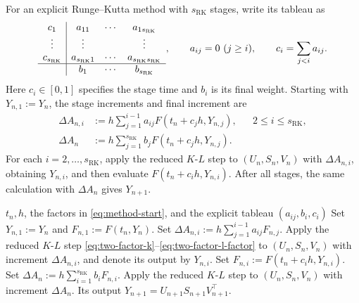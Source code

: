 \documentclass[]{article}
\numberwithin{equation}{section}
\theoremstyle{plain}
\theoremstyle{remark}
\numberwithin{algorithm}{section}
\begin{document}
For an explicit Runge--Kutta method with \(s_{\mathrm{RK}}\) stages,
write its tableau as
\[
 \begin{array}{c|ccc}
  c_1&a_{11}&\cdots&a_{1s_{\mathrm{RK}}}\\
  \vdots&\vdots&&\vdots\\
  c_{s_{\mathrm{RK}}}&a_{s_{\mathrm{RK}}1}&\cdots&a_{s_{\mathrm{RK}}s_{\mathrm{RK}}}\\ \hline
   &b_1&\cdots&b_{s_{\mathrm{RK}}}
 \end{array},
 \qquad a_{ij}=0\ (j\ge i),\qquad
 c_i=\sum_{j<i}a_{ij}.
\]
Here \(c_i\in[0,1]\) specifies the stage time and \(b_i\) is its final
weight.  Starting with \(Y_{n,1}:=Y_n\), the stage increments and final
increment are
\begin{equation}\label{eq:common-base-increments}
 \begin{aligned}
  \Delta A_{n,i}
  &:=h\sum_{j=1}^{i-1}a_{ij}F(t_n+c_jh,Y_{n,j}),
  &&2\le i\le s_{\mathrm{RK}},\\
  \Delta A_n
  &:=h\sum_{j=1}^{s_{\mathrm{RK}}}b_jF(t_n+c_jh,Y_{n,j}).
 \end{aligned}
\end{equation}
For each \(i=2,\ldots,s_{\mathrm{RK}}\), apply the reduced \(K\)-\(L\) step to
\((U_n,S_n,V_n)\) with
\(\Delta A_{n,i}\), obtaining \(Y_{n,i}\), and then evaluate
\(F(t_n+c_i h,Y_{n,i})\).  After all stages, the same calculation with
\(\Delta A_n\) gives \(Y_{n+1}\).

\begin{algorithm}[htbp]
\caption{One step of the projector-splitting Runge--Kutta method.}
\label{alg:common-base-rk}
\begin{algorithmic}[1]
\Require \(t_n,h\), the factors in \eqref{eq:method-start}, and
the explicit tableau \((a_{ij},b_i,c_i)\)
\State Set \(Y_{n,1}:=Y_n\) and \(F_{n,1}:=F(t_n,Y_n)\).
 \State Set \(\Delta A_{n,i}:=h\sum_{j=1}^{i-1}a_{ij}F_{n,j}\).
 \State Apply the reduced \(K\)-\(L\) step \eqref{eq:two-factor-k}--\eqref{eq:two-factor-l-factor}
 to \((U_n,S_n,V_n)\) with increment \(\Delta A_{n,i}\), and denote
 its output by \(Y_{n,i}\).
 \State Set \(F_{n,i}:=F(t_n+c_i h,Y_{n,i})\).
\EndFor
\State Set \(\Delta A_n:=h\sum_{i=1}^{s_{\mathrm{RK}}}b_iF_{n,i}\).
\State Apply the reduced \(K\)-\(L\) step to \((U_n,S_n,V_n)\) with increment
\(\Delta A_n\).
\Ensure Its output \(Y_{n+1}=U_{n+1}S_{n+1}V_{n+1}^\top\).
\end{algorithmic}
\end{algorithm}
\FloatBarrier
\end{document}
